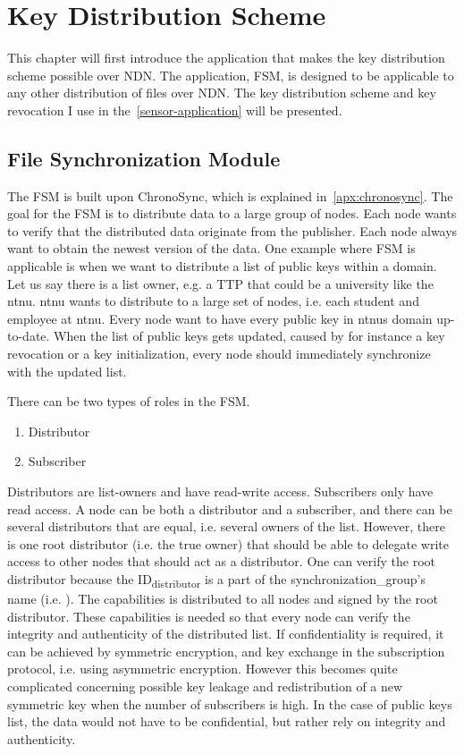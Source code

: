 \chapter{Key Distribution Scheme}\label{chp3:file-sync}
This chapter will first introduce the application that makes the key distribution scheme possible over \gls{NDN}.
The application, \gls{FSM}, is designed to be applicable to any other distribution of files over \gls{NDN}.
The key distribution scheme and key revocation I use in the~\autoref{sensor-application} will be presented.

\section{File Synchronization Module}\label{file-sync}
The \gls{FSM} is built upon ChronoSync, which is explained in~\autoref{apx:chronosync}.
The goal for the \gls{FSM} is to distribute \gls{data} to a large group of nodes.
Each node wants to verify that the distributed \gls{data} originate from the \gls{publisher}.
Each node always want to obtain the newest version of the \gls{data}. 
One example where \gls{FSM} is applicable is when we want to distribute a list of public keys within a domain.
Let us say there is a list owner, e.g. a \gls{TTP} that could be a university like the \gls{ntnu}.
\gls{ntnu} wants to distribute to a large set of nodes, i.e. each student and employee at \gls{ntnu}.
Every node want to have every public key in \gls{ntnu}s domain up-to-date.
When the list of public keys gets updated, caused by for instance a key revocation or a key initialization, every node should immediately synchronize with the updated list.

There can be two types of roles in the \gls{FSM}. 
\begin{enumerate}
	\item Distributor
	\item Subscriber
\end{enumerate}
Distributors are list-owners and have read-write access.
Subscribers only have read access.
A node can be both a distributor and a subscriber, and there can be several distributors that are equal, i.e. several owners of the list.
However, there is one root distributor (i.e. the true owner) that should be able to delegate write access to other nodes that should act as a distributor. 
One can verify the root distributor because the ID\textsubscript{distributor} is a part of the \gls{synchronization_group}'s \gls{name} (i.e. ).
The capabilities is distributed to all nodes and signed by the root distributor.
These capabilities is needed so that every node can verify the integrity and authenticity of the distributed list.
If confidentiality is required, it can be achieved by symmetric encryption, and key exchange in the subscription protocol, i.e. using asymmetric encryption.
However this becomes quite complicated concerning possible key leakage and redistribution of a new symmetric key when the number of subscribers is high. 
In the case of public keys list, the data would not have to be confidential, but rather rely on integrity and authenticity.



